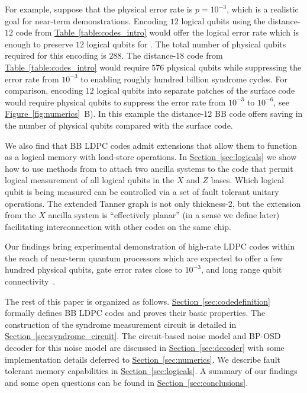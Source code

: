 \documentclass{article}
\renewcommand{\sec}[1]{\hyperref[sec:#1]{Section~\ref*{sec:#1}}}
\newcommand{\fig}[1]{\hyperref[fig:#1]{Figure~\ref*{fig:#1}}}
\newcommand{\tab}[1]{\hyperref[table:#1]{Table~\ref*{table:#1}}}
\newcommand{\edit}[1]{{\color{black}{#1}}}
\begin{document}
For example, suppose that the physical error rate is $p=10^{-3}$, which is a realistic goal for near-term demonstrations. 
Encoding $12$ logical qubits using the distance-$12$ code from \tab{codes_intro} would offer the logical error rate \edit{$2\times 10^{-7}$} which is enough to preserve $12$ logical qubits for
\edit{nearly one million syndrome cycles}.
The total number of physical qubits required
for this encoding is  $288$.
The distance-$18$ code from \tab{codes_intro} would require $576$ physical qubits while suppressing the error rate from $10^{-3}$ to \edit{$2\times 10^{-12}$}
enabling roughly hundred billion syndrome cycles.
For comparison, encoding  $12$ logical qubits into separate patches of the surface code
would require \edit{nearly $3000$} physical qubits to suppress the error rate from $10^{-3}$ to $10^{-6}$,
see \fig{numerics}~B).
In this example the distance-$12$ BB  code offers \edit{more than $10$X} saving in the number of  physical qubits compared with the surface code. 


We also find that BB LDPC codes admit extensions that allow them to function as a logical memory with load-store operations. In \sec{logicals} we show how to use methods from \cite{cohen2022lowoverhead} to attach two ancilla systems to the code that permit logical measurement of all logical qubits in the $X$ and $Z$ bases. Which logical qubit is being measured can be controlled via a set of fault tolerant unitary operations. The extended Tanner graph is not only thickness-2, but the extension from the $X$ ancilla system is ``effectively planar'' (in a sense we define later) facilitating interconnection with other codes on the same chip. 


Our findings bring experimental demonstration of high-rate LDPC codes within the reach of near-term quantum processors which are expected to offer a few hundred physical qubits, gate error rates close to $10^{-3}$, and long range qubit connectivity~\cite{bravyi2022future}. 

The rest of this paper is organized as follows. \sec{codedefinition} formally defines BB LDPC codes and proves their basic properties.  The construction of the syndrome measurement circuit is detailed in \sec{syndrome_circuit}.  The circuit-based noise model and BP-OSD decoder for this noise model are discussed in \sec{decoder} with some implementation details deferred to \sec{numerics}. We describe fault tolerant memory capabilities in \sec{logicals}.  A summary of our findings and some open questions can be found in \sec{conclusions}.
\end{document}
